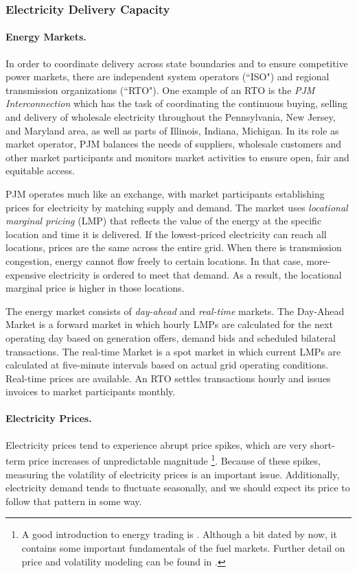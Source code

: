 \subsubsection{Electricity Delivery Capacity}
\paragraph{Energy Markets.}
In order to coordinate delivery across state boundaries and to ensure competitive power markets, there are independent system operators (``ISO") and regional transmission organizations (``RTO"). One example of an RTO is the \emph{PJM Interconnection} which has the task of coordinating the continuous buying, selling and delivery of wholesale electricity throughout the Pennsylvania, New Jersey, and Maryland area, as well as parts of Illinois, Indiana, Michigan. In its role as market operator, PJM balances the needs of suppliers, wholesale customers and other market participants and monitors market activities to ensure open, fair and equitable access.

PJM operates much like an exchange, with market participants establishing prices for electricity by matching supply and demand. The market uses \emph{locational marginal pricing} (LMP) that reflects the value of the energy at the specific location and time it is delivered. If the lowest-priced electricity can reach all locations, prices are the same across the entire grid. When there is transmission congestion, energy cannot flow freely to certain locations. In that case, more-expensive electricity is ordered to meet that demand. As a result, the locational marginal price is higher in those locations.

The energy market consists of \emph{day-ahead} and \emph{real-time} markets. The Day-Ahead Market is a forward market in which hourly LMPs are calculated for the next operating day based on generation offers, demand bids and scheduled bilateral transactions. The real-time Market is a spot market in which current LMPs are calculated at five-minute intervals based on actual grid operating conditions. Real-time prices are available. An RTO settles transactions hourly and issues invoices to market participants monthly.

\paragraph{Electricity Prices.} Electricity prices tend to experience abrupt price spikes, which are very short-term price increases of unpredictable magnitude \cite[p. 25]{weron2006mfel}\footnote{A good introduction to energy trading is . Although a bit dated by now, it contains some important fundamentals of the fuel markets. Further detail on price and volatility modeling can be found in .}.
Because of these spikes, measuring the volatility of electricity prices is an important issue. Additionally, electricity demand tends to fluctuate seasonally, and we should expect its price to follow that pattern in some way.

